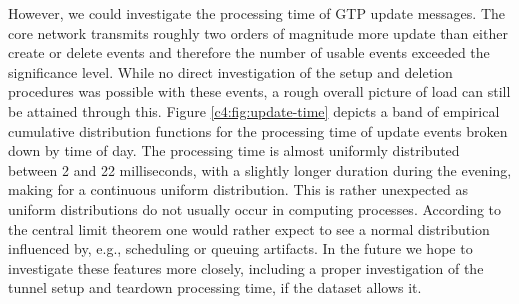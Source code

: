 However, we could investigate the processing time of \gls{GTP} update messages. The core network transmits roughly two orders of magnitude more update than either create or delete events and therefore the number of usable events exceeded the significance level. While no direct investigation of the setup and deletion procedures was possible with these events, a rough overall picture of load can still be attained through this. Figure \ref{c4:fig:update-time} depicts a band of empirical cumulative distribution functions for the processing time of update events broken down by time of day. The processing time is almost uniformly distributed between 2 and 22 milliseconds, with a slightly longer duration during the evening, making for a continuous uniform distribution. This is rather unexpected as uniform distributions do not usually occur in computing processes. According to the central limit theorem one would rather expect to see a normal distribution influenced by, e.g., scheduling or queuing artifacts. In the future we hope to investigate these features more closely, including a proper investigation of the tunnel setup and teardown processing time, if the dataset allows it.



%
%

